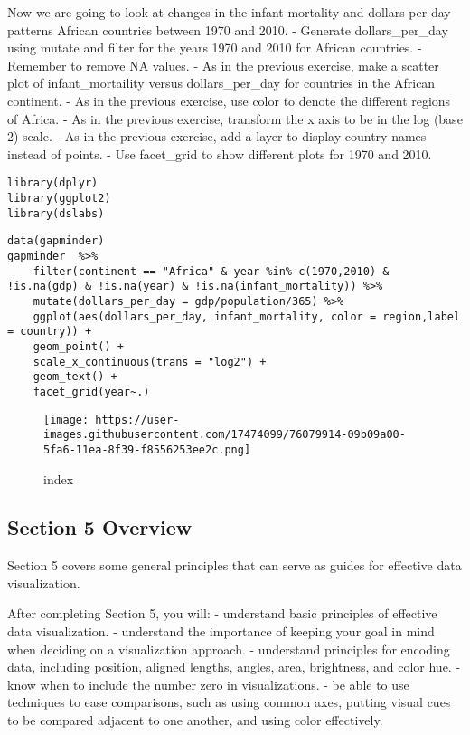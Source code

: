 \documentclass[]{article}
\begin{document}
Now we are going to look at changes in the infant mortality and dollars
per day patterns African countries between 1970 and 2010. - Generate
dollars\_per\_day using mutate and filter for the years 1970 and 2010
for African countries. - Remember to remove NA values. - As in the
previous exercise, make a scatter plot of infant\_mortaility versus
dollars\_per\_day for countries in the African continent. - As in the
previous exercise, use color to denote the different regions of Africa.
- As in the previous exercise, transform the x axis to be in the log
(base 2) scale. - As in the previous exercise, add a layer to display
country names instead of points. - Use facet\_grid to show different
plots for 1970 and 2010.

\begin{verbatim}
library(dplyr)
library(ggplot2)
library(dslabs)
\end{verbatim}

\begin{verbatim}
data(gapminder)
gapminder  %>%
    filter(continent == "Africa" & year %in% c(1970,2010) & !is.na(gdp) & !is.na(year) & !is.na(infant_mortality)) %>%
    mutate(dollars_per_day = gdp/population/365) %>%
    ggplot(aes(dollars_per_day, infant_mortality, color = region,label = country)) +
    geom_point() +
    scale_x_continuous(trans = "log2") +
    geom_text() +
    facet_grid(year~.)
\end{verbatim}

\begin{figure}
\centering
\texttt{[image: https://user-images.githubusercontent.com/17474099/76079914-09b09a00-5fa6-11ea-8f39-f8556253ee2c.png]}
\caption{index}
\end{figure}

\hypertarget{section-5-overview}{%
\subsection{Section 5 Overview}\label{section-5-overview}}

Section 5 covers some general principles that can serve as guides for
effective data visualization.

After completing Section 5, you will: - understand basic principles of
effective data visualization. - understand the importance of keeping
your goal in mind when deciding on a visualization approach. -
understand principles for encoding data, including position, aligned
lengths, angles, area, brightness, and color hue. - know when to include
the number zero in visualizations. - be able to use techniques to ease
comparisons, such as using common axes, putting visual cues to be
compared adjacent to one another, and using color effectively.
\end{document}

